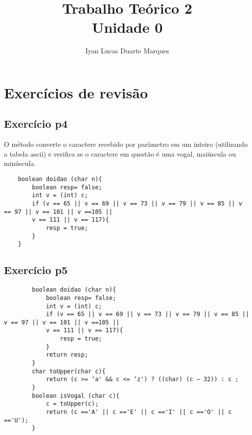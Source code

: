 \documentclass[12pt]{article}
\title{Trabalho Teórico 2\\Unidade 0}
\author{Iyan Lucas Duarte Marques}
\begin{document}
\maketitle

\section{Exercícios de revisão}
\subsection{Exercício p4}
O método converte o caractere recebido por parâmetro em um inteiro (utilizando a tabela ascii) e verifica
se o caractere em questão é uma vogal, maiúscula ou minúscula. 

\begin{scriptsize}


\begin{lstlisting}
    boolean doidao (char n){
        boolean resp= false;
        int v = (int) c;
        if (v == 65 || v == 69 || v == 73 || v == 79 || v == 85 || v == 97 || v == 101 || v ==105 ||
        v == 111 || v == 117){
            resp = true;
        }
    }

\end{lstlisting}
\end{scriptsize}
\subsection{Exercício p5}

\begin{scriptsize}
    
    \begin{lstlisting}
        boolean doidao (char n){
            boolean resp= false;
            int v = (int) c;
            if (v == 65 || v == 69 || v == 73 || v == 79 || v == 85 || v == 97 || v == 101 || v ==105 ||
            v == 111 || v == 117){
                resp = true;
            }
            return resp;
        }
        char toUpper(char c){
            return (c >= ‘a' && c <= ‘z') ? ((char) (c – 32)) : c ;
        }
        boolean isVogal (char c){
            c = toUpper(c);
            return (c =='A' || c =='E' || c =='I' || c =='O' || c =='U');
        }
    
    \end{lstlisting}
    \end{scriptsize}
\end{document}
